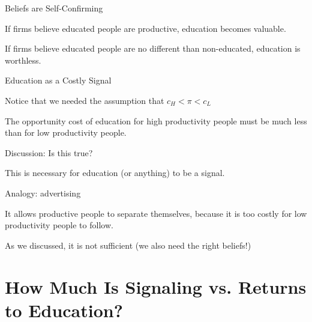 \documentclass[aspectratio=169,usenames,dvipsnames]{beamer}
\newenvironment{wideitemize}{\itemize\addtolength{\itemsep}{10pt}}{\enditemize}
\begin{document}
\begin{frame}{Beliefs are Self-Confirming}

\begin{wideitemize}
    \item If firms believe educated people are productive, education becomes valuable.
    \item If firms believe educated people are no different than non-educated, education is worthless.
\end{wideitemize}
    
\end{frame}

\begin{frame}{Education as a Costly Signal}

\begin{wideitemize}
    \item Notice that we needed the assumption that $c_H<\pi < c_L$
    \item The opportunity cost of education for high productivity people must be much less than for low productivity people.
    \item Discussion: Is this true?
    \item This is necessary for education (or anything) to be a signal.
    \item Analogy: advertising
    \item It allows productive people to separate themselves, because it is too costly for low productivity people to follow.
    \item As we discussed, it is not sufficient (we also need the right beliefs!)
\end{wideitemize}
    
\end{frame}

\section{How Much Is Signaling vs. Returns to Education?}
\end{document}
